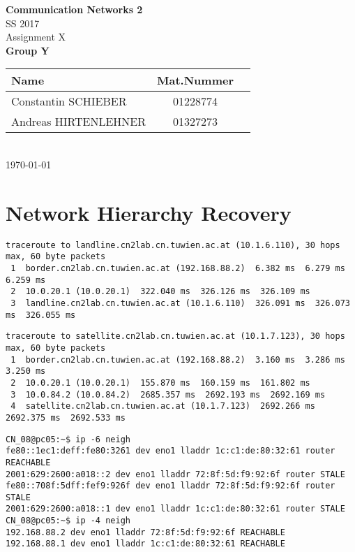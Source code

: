 \documentclass[parskip=full]{scrartcl}
\begin{document}
\begin{titlepage}
    \centering
    \vspace*{2cm}
    {\Huge \textbf{Communication Networks 2}}\\
    SS 2017\\
    \vspace*{1cm}
    {\Large Assignment X}
    \\\vspace*{3cm}
    {\Large \textbf{Group Y}}\\
    \vspace*{1cm}
    {\large 
        \begin{tabular}{l c c}
            Name & Mat.Nummer \\ \hline
            Constantin SCHIEBER & 01228774 \\
            Andreas HIRTENLEHNER & 01327273
        \end{tabular}
    }
    \\\vspace*{7cm}
    \today
\end{titlepage}

\section{Network Hierarchy Recovery}

\begin{verbatim}
traceroute to landline.cn2lab.cn.tuwien.ac.at (10.1.6.110), 30 hops max, 60 byte packets
 1  border.cn2lab.cn.tuwien.ac.at (192.168.88.2)  6.382 ms  6.279 ms  6.259 ms
 2  10.0.20.1 (10.0.20.1)  322.040 ms  326.126 ms  326.109 ms
 3  landline.cn2lab.cn.tuwien.ac.at (10.1.6.110)  326.091 ms  326.073 ms  326.055 ms
\end{verbatim}

\begin{verbatim}
traceroute to satellite.cn2lab.cn.tuwien.ac.at (10.1.7.123), 30 hops max, 60 byte packets
 1  border.cn2lab.cn.tuwien.ac.at (192.168.88.2)  3.160 ms  3.286 ms  3.250 ms
 2  10.0.20.1 (10.0.20.1)  155.870 ms  160.159 ms  161.802 ms
 3  10.0.84.2 (10.0.84.2)  2685.357 ms  2692.193 ms  2692.169 ms
 4  satellite.cn2lab.cn.tuwien.ac.at (10.1.7.123)  2692.266 ms  2692.375 ms  2692.533 ms
\end{verbatim}

\begin{verbatim}
CN_08@pc05:~$ ip -6 neigh
fe80::1ec1:deff:fe80:3261 dev eno1 lladdr 1c:c1:de:80:32:61 router REACHABLE
2001:629:2600:a018::2 dev eno1 lladdr 72:8f:5d:f9:92:6f router STALE
fe80::708f:5dff:fef9:926f dev eno1 lladdr 72:8f:5d:f9:92:6f router STALE
2001:629:2600:a018::1 dev eno1 lladdr 1c:c1:de:80:32:61 router STALE
CN_08@pc05:~$ ip -4 neigh
192.168.88.2 dev eno1 lladdr 72:8f:5d:f9:92:6f REACHABLE
192.168.88.1 dev eno1 lladdr 1c:c1:de:80:32:61 REACHABLE
\end{verbatim}
\end{document}

